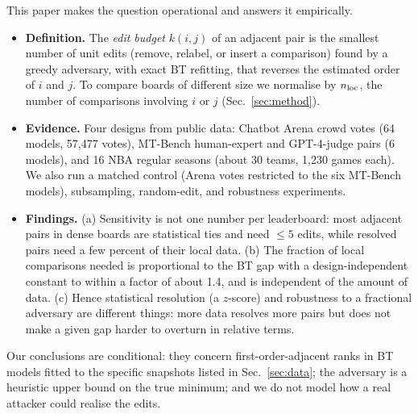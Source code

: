 \documentclass{article}
\newcommand{\nloc}{n_{\rm loc}}
\begin{document}
This paper makes the question operational and answers it empirically.
\begin{itemize}
\item \textbf{Definition.} The \emph{edit budget} $k(i,j)$ of an adjacent pair is the smallest number of unit edits (remove, relabel, or insert a comparison) found by a greedy adversary, with exact BT refitting, that reverses the estimated order of $i$ and $j$. To compare boards of different size we normalise by $\nloc$, the number of comparisons involving $i$ or $j$ (Sec.~\ref{sec:method}).
\item \textbf{Evidence.} Four designs from public data: Chatbot Arena crowd votes (64 models, 57{,}477 votes), MT-Bench human-expert and GPT-4-judge pairs (6 models), and 16 NBA regular seasons (about 30 teams, 1{,}230 games each). We also run a matched control (Arena votes restricted to the six MT-Bench models), subsampling, random-edit, and robustness experiments.
\item \textbf{Findings.} (a) Sensitivity is not one number per leaderboard: most adjacent pairs in dense boards are statistical ties and need $\leq5$ edits, while resolved pairs need a few percent of their local data. (b) The fraction of local comparisons needed is proportional to the BT gap with a design-independent constant to within a factor of about 1.4, and is independent of the amount of data. (c) Hence statistical resolution (a $z$-score) and robustness to a fractional adversary are different things: more data resolves more pairs but does not make a given gap harder to overturn in relative terms.
\end{itemize}
Our conclusions are conditional: they concern first-order-adjacent ranks in BT models fitted to the specific snapshots listed in Sec.~\ref{sec:data}; the adversary is a heuristic upper bound on the true minimum; and we do not model how a real attacker could realise the edits.
\end{document}
